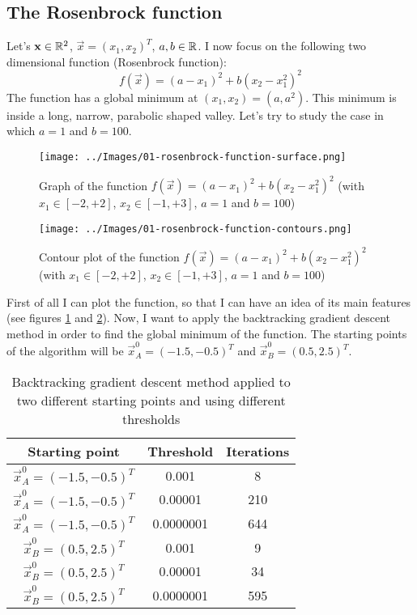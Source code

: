    \subsection{The Rosenbrock function}
        Let's \(\mathbf{x} \in \mathbb{R}^2\), \(\vec{x} = (x_1, x_2)^T\), \(a,b \in \mathbb{R}\). I now focus on the following two dimensional function (Rosenbrock function):
        \[f(\vec{x}) = (a - x_1)^2 + b(x_2 - x_1^2)^2\]
        The function has a global minimum at \((x_1, x_2) = (a, a^2)\). This minimum is inside a long, narrow, parabolic shaped valley. Let's try to study the case in which \(a=1\) and \(b=100\).
        \begin{figure}
            \centering
            \texttt{[image: ../Images/01-rosenbrock-function-surface.png]}
            \caption{Graph of the function \(f(\vec{x}) = (a - x_1)^2 + b(x_2 - x_1^2)^2\) (with \(x_1 \in [-2, +2]\), \(x_2 \in [-1, +3]\), \(a=1\) and \(b=100\))}
            \label{rosenbrock-function-surface}
        \end{figure}
        \begin{figure}
            \centering
            \texttt{[image: ../Images/01-rosenbrock-function-contours.png]}
            \caption{Contour plot of the function \(f(\vec{x}) = (a - x_1)^2 + b(x_2 - x_1^2)^2\) (with \(x_1 \in [-2, +2]\), \(x_2 \in [-1, +3]\), \(a=1\) and \(b=100\))}
            \label{rosenbrock-function-contours}
        \end{figure}
        First of all I can plot the function, so that I can have an idea of its main features (see figures \ref{rosenbrock-function-surface} and \ref{rosenbrock-function-contours}). Now, I want to apply the backtracking gradient descent method in order to find the global minimum of the function. The starting points of the algorithm will be \(\vec{x}_A^0 = (-1.5,-0.5)^T\) and \(\vec{x}_B^0 = (0.5, 2.5)^T\).
        \begin{table}
            \centering
            \begin{tabu}{| c | c | c |}
                \hline
                Starting point &                    Threshold &     Iterations \\ \hline \hline
                \(\vec{x}_A^0 = (-1.5,-0.5)^T\) &   0.001 &         8 \\ \hline
                \(\vec{x}_A^0 = (-1.5,-0.5)^T\) &   0.00001 &       210 \\ \hline
                \(\vec{x}_A^0 = (-1.5,-0.5)^T\) &   0.0000001 &     644 \\ \hline
                \(\vec{x}_B^0 = (0.5, 2.5)^T\) &    0.001 &         9 \\ \hline
                \(\vec{x}_B^0 = (0.5, 2.5)^T\) &    0.00001 &       34 \\ \hline
                \(\vec{x}_B^0 = (0.5, 2.5)^T\) &    0.0000001 &     595 \\ \hline
            \end{tabu}
            \caption{Backtracking gradient descent method applied to two different starting points and using different thresholds}
            \label{backtracking-algorithm-experiments-results}
        \end{table}
